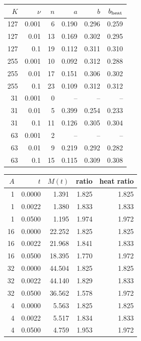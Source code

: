 \begin{center}\small\begin{tabular}{rrrrrr}$K$&$\nu$&$n$&$a$&$b$&$b_{\rm heat}$\\\hline
127&0.001&6&0.190&0.296&0.259\\
127&0.01&13&0.169&0.302&0.295\\
127&0.1&19&0.112&0.311&0.310\\
255&0.001&10&0.092&0.312&0.288\\
255&0.01&17&0.151&0.306&0.302\\
255&0.1&23&0.109&0.312&0.312\\
31&0.001&0&--&--&--\\
31&0.01&5&0.399&0.254&0.233\\
31&0.1&11&0.126&0.305&0.304\\
63&0.001&2&--&--&--\\
63&0.01&9&0.219&0.292&0.282\\
63&0.1&15&0.115&0.309&0.308\\
\end{tabular}\end{center}
\begin{center}\small\begin{tabular}{rrrrr}$A$&$t$&$M(t)$&ratio&heat ratio\\\hline
1&0.0000&1.391&1.825&1.825\\
1&0.0022&1.380&1.833&1.833\\
1&0.0500&1.195&1.974&1.972\\
16&0.0000&22.252&1.825&1.825\\
16&0.0022&21.968&1.841&1.833\\
16&0.0500&18.395&1.770&1.972\\
32&0.0000&44.504&1.825&1.825\\
32&0.0022&44.140&1.829&1.833\\
32&0.0500&36.562&1.578&1.972\\
4&0.0000&5.563&1.825&1.825\\
4&0.0022&5.517&1.834&1.833\\
4&0.0500&4.759&1.953&1.972\\
\end{tabular}\end{center}
